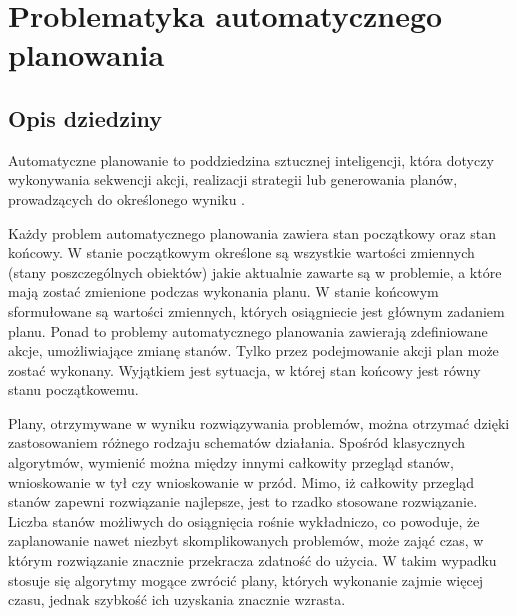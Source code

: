 \chapter{Problematyka automatycznego planowania}
 \section{Opis dziedziny}
Automatyczne planowanie to poddziedzina sztucznej inteligencji, która dotyczy wykonywania sekwencji akcji, realizacji strategii lub generowania planów, prowadzących do określonego wyniku .

Każdy problem automatycznego planowania zawiera stan początkowy oraz stan końcowy. W stanie początkowym określone są wszystkie wartości zmiennych (stany poszczególnych obiektów) jakie aktualnie zawarte są w problemie, a które mają zostać zmienione podczas wykonania planu. W stanie końcowym sformułowane są wartości zmiennych, których osiągniecie jest głównym zadaniem planu. Ponad to problemy automatycznego planowania zawierają zdefiniowane akcje, umożliwiające zmianę stanów.   Tylko przez podejmowanie akcji plan może zostać wykonany. Wyjątkiem jest sytuacja, w której stan końcowy jest równy stanu początkowemu.

Plany, otrzymywane w wyniku rozwiązywania problemów, można otrzymać dzięki zastosowaniem różnego rodzaju schematów działania. Spośród klasycznych algorytmów, wymienić można między innymi całkowity przegląd stanów, wnioskowanie w tył czy wnioskowanie w przód. Mimo, iż całkowity przegląd stanów zapewni rozwiązanie najlepsze, jest to rzadko stosowane rozwiązanie. Liczba stanów możliwych do osiągnięcia rośnie wykładniczo, co powoduje, że zaplanowanie nawet niezbyt skomplikowanych problemów, może zająć czas, w którym rozwiązanie znacznie przekracza zdatność do użycia. W takim wypadku stosuje się algorytmy mogące zwrócić plany, których wykonanie zajmie więcej czasu, jednak szybkość ich uzyskania znacznie wzrasta. 

